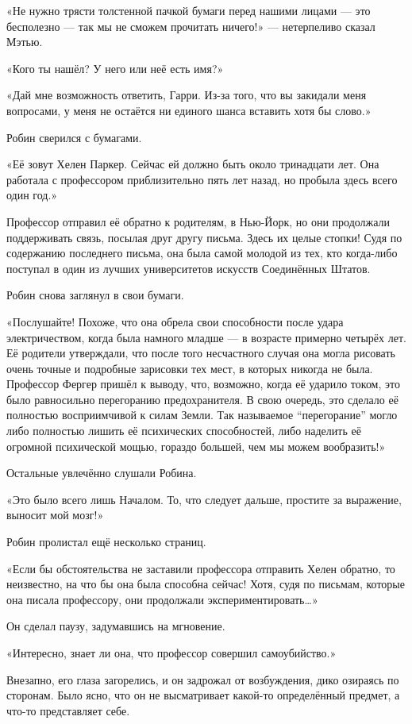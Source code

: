 \documentclass[a5paper, 9pt,
final, openany, twoside=true]{memoir}
\begin{document}
«Не нужно трясти толстенной пачкой бумаги перед нашими лицами — это бесполезно — так мы не сможем прочитать ничего!» — нетерпеливо сказал Мэтью.

«Кого ты нашёл? У него или неё есть имя?»

«Дай мне возможность ответить, Гарри. Из-за того, что вы закидали меня вопросами, у меня не остаётся ни единого шанса вставить хотя бы слово.»

Робин сверился с бумагами.

«Её зовут Хелен Паркер. Сейчас ей должно быть около тринадцати лет. Она работала с профессором приблизительно пять лет назад, но пробыла здесь всего один год.»

Профессор отправил её обратно к родителям, в Нью-Йорк, но они продолжали поддерживать связь, посылая друг другу письма. Здесь их целые стопки! Судя по содержанию последнего письма, она была самой молодой из тех, кто когда-либо поступал в один из лучших университетов искусств Соединённых Штатов.

Робин снова заглянул в свои бумаги.

«Послушайте! Похоже, что она обрела свои способности после удара электричеством, когда была намного младше — в возрасте примерно четырёх лет. Её родители утверждали, что после того несчастного случая она могла рисовать очень точные и подробные зарисовки тех мест, в которых никогда не была. Профессор Фергер пришёл к выводу, что, возможно, когда её ударило током, это было равносильно перегоранию предохранителя. В свою очередь, это сделало её полностью восприимчивой к силам Земли. Так называемое ``перегорание'' могло либо полностью лишить её психических способностей, либо наделить её огромной психической мощью, гораздо большей, чем мы можем вообразить!»

Остальные увлечённо слушали Робина.

«Это было всего лишь Началом. То, что следует дальше, простите за выражение, выносит мой мозг!»

Робин пролистал ещё несколько страниц.

«Если бы обстоятельства не заставили профессора отправить Хелен обратно, то неизвестно, на что бы она была способна сейчас! Хотя, судя по письмам, которые она писала профессору, они продолжали экспериментировать…»

Он сделал паузу, задумавшись на мгновение.

«Интересно, знает ли она, что профессор совершил самоубийство.»

Внезапно, его глаза загорелись, и он задрожал от возбуждения, дико озираясь по сторонам. Было ясно, что он не высматривает какой-то определённый предмет, а что-то представляет себе.
\end{document}
